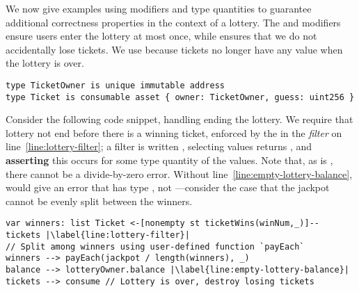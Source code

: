 \documentclass[dvipsnames,runningheads]{llncs}
\begin{document}
We now give examples using modifiers and type quantities to guarantee additional correctness properties in the context of a lottery.
The  and  modifiers ensure users enter the lottery at most once, while  ensures that we do not accidentally lose tickets.
We use  because tickets no longer have any value when the lottery is over.
\begin{lstlisting}[language=flow, xleftmargin=0.8em]
type TicketOwner is unique immutable address
type Ticket is consumable asset { owner: TicketOwner, guess: uint256 }
\end{lstlisting}
Consider the following code snippet, handling ending the lottery.
We require that lottery not end before there is a winning ticket, enforced by the  in the \emph{filter} on line~\ref{line:lottery-filter}; a filter is written \flowinline{[ q st P(x1,...,xn,_) ]}, selecting values    returns , and \textbf{asserting} this occurs for some type quantity  of the values.
Note that, as  is , there cannot be a divide-by-zero error.
Without line~\ref{line:empty-lottery-balance}, \langName would give an error that  has type , not ---consider the case that the jackpot cannot be evenly split between the winners.
\begin{lstlisting}[language=flow, xleftmargin=0.8em]
var winners: list Ticket <-[nonempty st ticketWins(winNum,_)]-- tickets |\label{line:lottery-filter}|
// Split among winners using user-defined function `payEach`
winners --> payEach(jackpot / length(winners), _)
balance --> lotteryOwner.balance |\label{line:empty-lottery-balance}|
tickets --> consume // Lottery is over, destroy losing tickets
\end{lstlisting}
\end{document}
